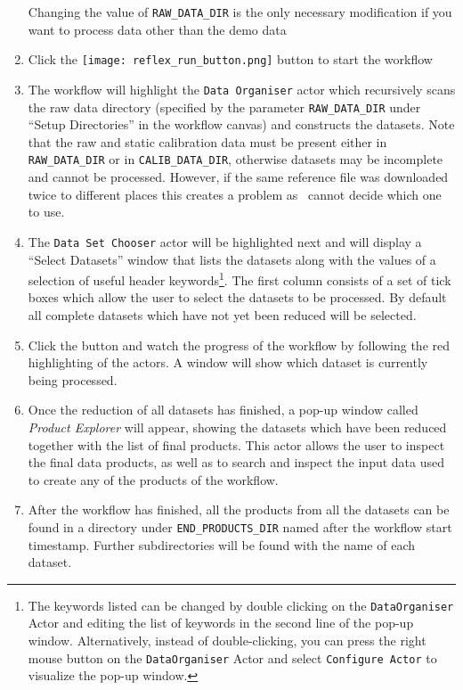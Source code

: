 \documentclass[pdftex,a4paper,twoside,11pt]{article}
\begin{document}
\begin{enumerate}
    Changing the value of {\tt RAW\_DATA\_DIR} is the only necessary
    modification if you want to process data other than the demo data

  \item Click the 
  \texttt{[image: reflex\_run\_button.png]}
  button to start the workflow

\item The workflow will highlight the {\tt Data Organiser} actor which
  recursively scans the raw data directory (specified by the parameter
  {\tt RAW\_DATA\_DIR} under ``Setup Directories'' in the workflow
  canvas) and constructs the datasets. Note that the raw and static
  calibration data must be present either in {\tt RAW\_DATA\_DIR} or
  in {\tt CALIB\_DATA\_DIR}, otherwise datasets may be incomplete and
  cannot be processed. However, if the same reference file was
  downloaded twice to different places this creates a problem as
  \ cannot decide which one to use.

\item The {\tt Data Set Chooser} actor will be highlighted next and
  will display a ``Select Datasets'' window that lists the datasets
  along with the values of a selection of useful header
  keywords\footnote{The keywords listed can be changed by double
    clicking on the {\tt DataOrganiser} Actor and editing the list of
    keywords in the second line of the pop-up window. Alternatively,
    instead of double-clicking, you can press the right mouse button
    on the {\tt DataOrganiser} Actor and select {\tt Configure Actor} to
    visualize the pop-up window.}.  The first column consists of a set
  of tick boxes which allow the user to select the datasets to be
  processed. By default all complete datasets which have not yet been
  reduced will be selected.

  \item Click the  button and watch the progress of
    the workflow by following the red highlighting of the actors. A
    window will show which dataset is currently being processed.

\ifdefined \instquickitemlist 
  
\fi

\item Once the reduction of all datasets has finished, a pop-up window
  called {\sl Product Explorer} will appear, showing the datasets
  which have been reduced together with the list of final products.
  This actor allows the user to inspect the final data products, as
  well as to search and inspect the input data used to create any of
  the products of the workflow.

\item After the workflow has finished, all the products from all the
  datasets can be found in a directory under {\tt END\_PRODUCTS\_DIR}
  named after the workflow start timestamp. Further subdirectories
  will be found with the name of each dataset.

\end{enumerate}
\end{document}
